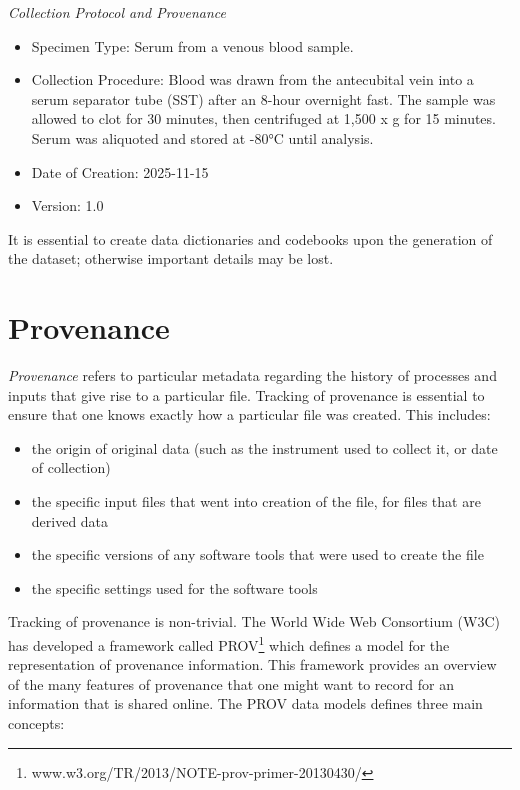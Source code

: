 \textit{Collection Protocol and Provenance}

\begin{itemize}
\item Specimen Type: Serum from a venous blood sample.
\item Collection Procedure: Blood was drawn from the antecubital vein into a serum separator tube (SST) after an 8-hour overnight fast. The sample was allowed to clot for 30 minutes, then centrifuged at 1,500 x g for 15 minutes. Serum was aliquoted and stored at -80°C until analysis.
\item Date of Creation: 2025-11-15
\item Version: 1.0
\end{itemize}

It is essential to create data dictionaries and codebooks upon the generation of the dataset; otherwise important details may be lost.

\section{Provenance}

\textit{Provenance} refers to particular metadata regarding the history of processes and inputs that give rise to a particular file.  Tracking of provenance is essential to ensure that one knows exactly how a particular file was created.  This includes:

\begin{itemize}
\item the origin of original data (such as the instrument used to collect it, or date of collection)
\item the specific input files that went into creation of the file, for files that are derived data
\item the specific versions of any software tools that were used to create the file
\item the specific settings used for the software tools
\end{itemize}

Tracking of provenance is non-trivial.  The World Wide Web Consortium (W3C) has developed a framework called PROV\footnote{www.w3.org/TR/2013/NOTE-prov-primer-20130430/} which defines a model for the representation of provenance information.  This framework provides an overview of the many features of provenance that one might want to record for an information that is shared online.  The PROV data models defines three main concepts:

